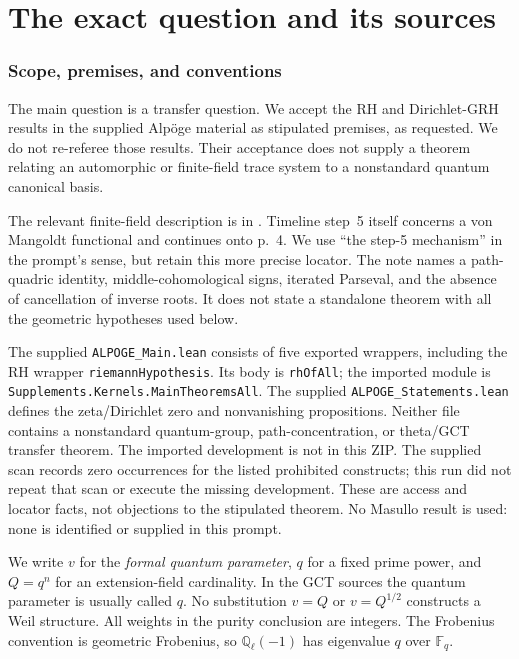\documentclass[11pt,a4paper]{article}
\newcommand{\Q}{\mathbb Q}\newcommand{\Z}{\mathbb Z}\newcommand{\C}{\mathbb C}\newcommand{\N}{\mathbb N}\newcommand{\F}{\mathbb F}
\theoremstyle{named}\newtheorem{finding}{Finding}[section]
\theoremstyle{definition}\newtheorem{definition}[finding]{Definition}
\theoremstyle{remark}\newtheorem{remark}[finding]{Remark}
\begin{document}
\part{The exact question and its sources}
\section{Scope, premises, and conventions}\label{sec:scope}
The main question is a transfer question. We accept the RH and Dirichlet-GRH results in the supplied Alp\"oge material as stipulated premises, as requested. We do not re-referee those results. Their acceptance does not supply a theorem relating an automorphic or finite-field trace system to a nonstandard quantum canonical basis.

The relevant finite-field description is in \cite[printed p.~3, footnote~3, attached to the paragraph before the timeline; also step~3]{Alpoge}. Timeline step~5 itself concerns a von Mangoldt functional and continues onto p.~4. We use ``the step-5 mechanism'' in the prompt's sense, but retain this more precise locator. The note names a path-quadric identity, middle-cohomological signs, iterated Parseval, and the absence of cancellation of inverse roots. It does not state a standalone theorem with all the geometric hypotheses used below.

The supplied \texttt{ALPOGE\_Main.lean} consists of five exported wrappers, including the RH wrapper \texttt{riemannHypothesis}. Its body is \texttt{rhOfAll}; the imported module is \texttt{Supplements.Kernels.\allowbreak MainTheoremsAll}. The supplied \texttt{ALPOGE\_Statements.lean} defines the zeta/Dirichlet zero and nonvanishing propositions. Neither file contains a nonstandard quantum-group, path-concentration, or theta/GCT transfer theorem. The imported development is not in this ZIP. The supplied scan records zero occurrences for the listed prohibited constructs; this run did not repeat that scan or execute the missing development. These are access and locator facts, not objections to the stipulated theorem. No Masullo result is used: none is identified or supplied in this prompt.

We write $v$ for the \emph{formal quantum parameter}, $q$ for a fixed prime power, and $Q=q^n$ for an extension-field cardinality. In the GCT sources the quantum parameter is usually called $q$. No substitution $v=Q$ or $v=Q^{1/2}$ constructs a Weil structure. All weights in the purity conclusion are integers. The Frobenius convention is geometric Frobenius, so $\Q_\ell(-1)$ has eigenvalue $q$ over $\F_q$.
\end{document}
